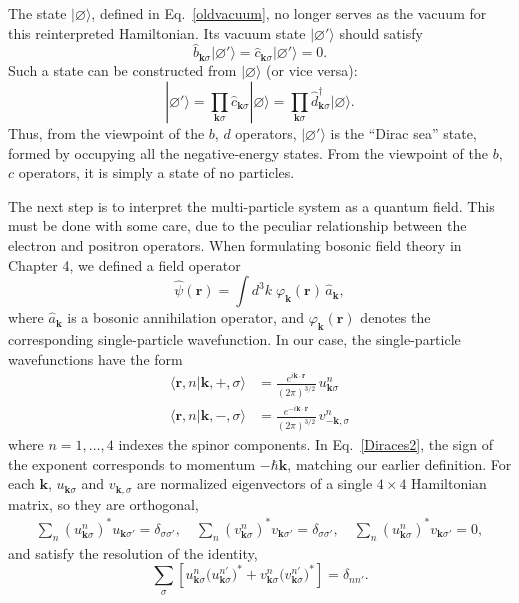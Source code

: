\documentclass[prx,12pt]{revtex4-2}
\begin{document}
The state $|\varnothing\rangle$, defined in Eq.~\eqref{oldvacuum}, no
longer serves as the vacuum for this reinterpreted Hamiltonian.  Its
vacuum state $|\varnothing'\rangle$ should satisfy
\begin{equation}
  \hat{b}_{\mathbf{k}\sigma} |\varnothing'\rangle =
  \hat{c}_{\mathbf{k}\sigma} |\varnothing'\rangle = 0.
\end{equation}
Such a state can be constructed from $|\varnothing\rangle$ (or vice
versa):
\begin{equation}
  |\varnothing'\rangle
  = \prod_{\mathbf{k}\sigma} \hat{c}_{\mathbf{k}\sigma} |\varnothing\rangle
  = \prod_{\mathbf{k}\sigma} \hat{d}_{\mathbf{k}\sigma}^\dagger
  |\varnothing\rangle.
\end{equation}
Thus, from the viewpoint of the $b$, $d$ operators,
$|\varnothing'\rangle$ is the ``Dirac sea'' state, formed by occupying
all the negative-energy states.  From the viewpoint of the $b$, $c$
operators, it is simply a state of no particles.

The next step is to interpret the multi-particle system as a quantum
field.  This must be done with some care, due to the peculiar
relationship between the electron and positron operators.  When
formulating bosonic field theory in Chapter 4, we defined a field
operator
\begin{equation}
  \hat{\psi}(\mathbf{r})
  = \int d^3k \; \varphi_{\mathbf{k}}(\mathbf{r}) \, \hat{a}_{\mathbf{k}},
  \label{psidef_old}
\end{equation}
where $\hat{a}_{\mathbf{k}}$ is a bosonic annihilation operator, and
$\varphi_{\mathbf{k}}(\mathbf{r})$ denotes the corresponding
single-particle wavefunction.  In our case, the single-particle
wavefunctions have the form
\begin{align}
  \langle \mathbf{r}, n | \mathbf{k}, +, \sigma\rangle
  &= \frac{e^{i\mathbf{k}\cdot \mathbf{r}}}{(2\pi)^{3/2}} \, u_{\mathbf{k}\sigma}^n
  \label{Diraces1} \\
  \langle \mathbf{r}, n | \mathbf{k}, -, \sigma\rangle
  &= \frac{e^{-i\mathbf{k}\cdot \mathbf{r}}}{(2\pi)^{3/2}} \, v_{-\mathbf{k},\sigma}^n
  \label{Diraces2}
\end{align}
where $n = 1, \dots, 4$ indexes the spinor components.  In
Eq.~\eqref{Diraces2}, the sign of the exponent corresponds to momentum
$-\hbar\mathbf{k}$, matching our earlier definition.  For each
$\mathbf{k}$, $u_{\mathbf{k}\sigma}$ and $v_{\mathbf{k},\sigma}$ are
normalized eigenvectors of a single $4\times4$ Hamiltonian matrix, so
they are orthogonal,
\begin{align}
  \sum_n \left(u_{\mathbf{k}\sigma}^n\right)^* u_{\mathbf{k}\sigma'}
  = \delta_{\sigma\sigma'}, \quad
  \sum_n \left(v_{\mathbf{k}\sigma}^n\right)^* v_{\mathbf{k}\sigma'}
  = \delta_{\sigma\sigma'}, \quad
  \sum_n \left(u_{\mathbf{k}\sigma}^n\right)^* v_{\mathbf{k}\sigma'}
  = 0,
\end{align} 
and satisfy the resolution of the identity,
\begin{equation}
  \sum_\sigma \left[
    u_{\mathbf{k}\sigma}^n \big(u_{\mathbf{k}\sigma}^{n'}\big)^*
    + v_{\mathbf{k}\sigma}^n \big(v_{\mathbf{k}\sigma}^{n'}\big)^*\right]
  = \delta_{nn'}.
  \label{iresolv}
\end{equation}
\end{document}
